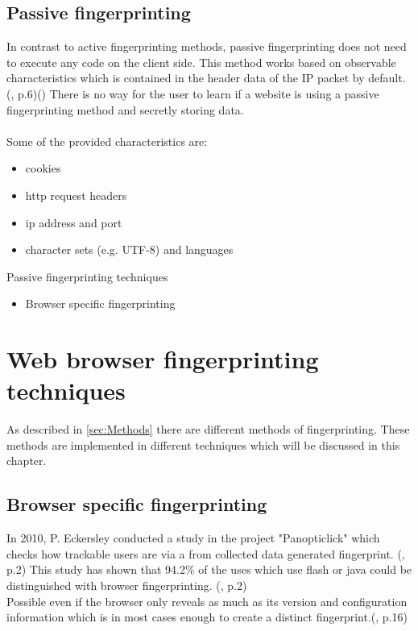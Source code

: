 \subsection{Passive fingerprinting}
In contrast to active fingerprinting methods, passive fingerprinting does not need to execute any code on the client side. This method works based on observable characteristics which is contained in the header data of the IP packet by default. (\textcite{doty18}, p.6)(\textcite{web17}) There is no way for the user to learn if a website is using a passive fingerprinting method and secretly storing data.\\\\
Some of the provided characteristics are:
\begin{itemize}
	\item cookies
	\item http request headers
	\item ip address and port
	\item character sets (e.g. UTF-8) and languages\\
\end{itemize}
Passive fingerprinting techniques
\begin{itemize}
	\item Browser specific fingerprinting
\end{itemize}

\section{Web browser fingerprinting techniques}
As described in \autoref{sec:Methods} there are different methods of fingerprinting. These methods are implemented in different techniques which will be discussed in this chapter.
\subsection{Browser specific fingerprinting}
In 2010, P. Eckersley conducted a study in the project "Panopticlick" which checks how trackable users are via a from collected data generated fingerprint. (\textcite{upi15}, p.2) This study has shown that 94.2\% of the uses which use flash or java could be distinguished with browser fingerprinting. (\textcite{eckersley10}, p.2)\\
Possible even if the browser only reveals as much as its version and configuration information which is in most cases enough to create a distinct fingerprint.(\textcite{eckersley10}, p.16)

